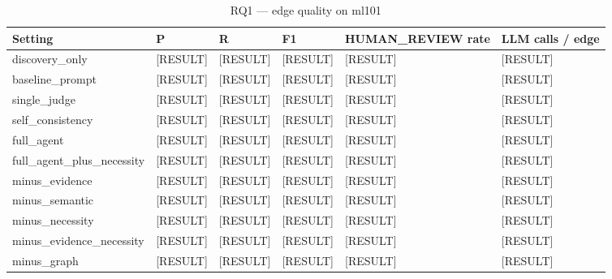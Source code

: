 \begin{table}[t]
\centering
\caption{RQ1 --- edge quality on ml101}
\label{tab:rq1_ml101}
\small
\begin{tabular}{llllll}
\toprule
Setting & P & R & F1 & HUMAN\_REVIEW rate & LLM calls / edge \\
\midrule
discovery\_only & [RESULT] & [RESULT] & [RESULT] & [RESULT] & [RESULT] \\
baseline\_prompt & [RESULT] & [RESULT] & [RESULT] & [RESULT] & [RESULT] \\
single\_judge & [RESULT] & [RESULT] & [RESULT] & [RESULT] & [RESULT] \\
self\_consistency & [RESULT] & [RESULT] & [RESULT] & [RESULT] & [RESULT] \\
full\_agent & [RESULT] & [RESULT] & [RESULT] & [RESULT] & [RESULT] \\
full\_agent\_plus\_necessity & [RESULT] & [RESULT] & [RESULT] & [RESULT] & [RESULT] \\
minus\_evidence & [RESULT] & [RESULT] & [RESULT] & [RESULT] & [RESULT] \\
minus\_semantic & [RESULT] & [RESULT] & [RESULT] & [RESULT] & [RESULT] \\
minus\_necessity & [RESULT] & [RESULT] & [RESULT] & [RESULT] & [RESULT] \\
minus\_evidence\_necessity & [RESULT] & [RESULT] & [RESULT] & [RESULT] & [RESULT] \\
minus\_graph & [RESULT] & [RESULT] & [RESULT] & [RESULT] & [RESULT] \\
\bottomrule
\end{tabular}
\end{table}

